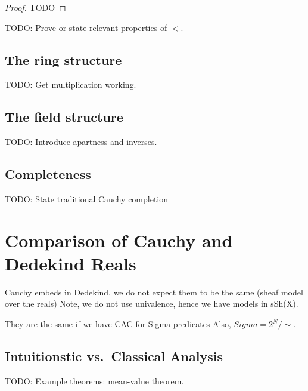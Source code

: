 \begin{proof}
  TODO
\end{proof}

TODO: Prove or state relevant properties of $<$.

\subsection{The ring structure}
\label{sec:ring-structure}

TODO: Get multiplication working.

\subsection{The field structure}
\label{sec:field-structure}

TODO: Introduce apartness and inverses.

\subsection{Completeness}
\label{sec:completeness-RC}

TODO: State traditional Cauchy completion



\section{Comparison of Cauchy and Dedekind Reals}
\label{sec:comp-cacuhy-dedek}

Cauchy embeds in Dedekind, we do not expect them to be the same (sheaf model over the
reals) Note, we do not use univalence, hence we have models in sSh(X).

They are the same if we have CAC for Sigma-predicates
Also, $Sigma = 2^N/\sim$.


\subsection{Intuitionstic vs.\ Classical Analysis}
\label{sec:intuitionistic-vs-classical-analysis}

TODO: Example theorems: mean-value theorem.


